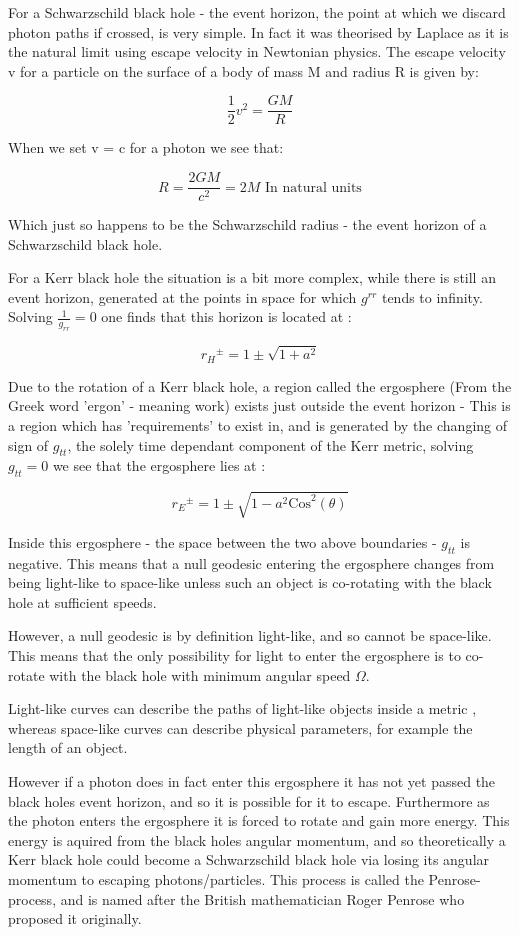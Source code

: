 \documentclass[oneside,openright,frontopenright]{dmathesis}
\begin{document}
	For a Schwarzschild black hole - the event horizon, the point at which we discard photon paths if crossed, is very simple. In fact it was theorised by Laplace as it is the natural limit using escape velocity in Newtonian physics. The escape velocity v for a particle on the surface of a body of mass M and radius R is given by:

	\[\frac{1}{2}v^2 = \frac{GM}{R}\]

	When we set v = c for a photon we see that:

	\[R = \frac{2GM}{c^2} = 2M \mbox{ In natural units}\]

	Which just so happens to be the Schwarzschild radius - the event horizon of a Schwarzschild black hole.

	For a Kerr black hole the situation is a bit more complex, while there is still an event horizon, generated at the points in space for which $g^{rr}$ tends to infinity. Solving $\frac{1}{g_{rr}} = 0$ one finds that this horizon is located at \cite{kerrMetric}:

	\[{r_{H}}^{\pm} = 1\pm\sqrt{1+a^2}\]

	Due to the rotation of a Kerr black hole, a region called the ergosphere (From the Greek word 'ergon' - meaning work) exists just outside the event horizon - This is a region which has 'requirements' to exist in, and is generated by the changing of sign of $g_{tt}$, the solely time dependant component of the Kerr metric, solving $g_{tt} = 0$ we see that the ergosphere lies at \cite{kerrMetric}:

	\[{r_{E}}^{\pm} = 1\pm\sqrt{1-a^2\mbox{Cos}^2(\theta)}\]

	Inside this ergosphere - the space between the two above boundaries - $g_{tt}$ is negative. This means that a null geodesic entering the ergosphere changes from being light-like to space-like unless such an object is co-rotating with the black hole at sufficient speeds.

	However, a null geodesic is by definition light-like, and so cannot be space-like. This means that the only possibility for light to enter the ergosphere is to co-rotate with the black hole with minimum angular speed $\Omega$.

	Light-like curves can describe the paths of light-like objects inside a metric , whereas space-like curves can describe physical parameters, for example the length of an object.

	However if a photon does in fact enter this ergosphere it has not yet passed the black holes event horizon, and so it is possible for it to escape. Furthermore as the photon enters the ergosphere it is forced to rotate and gain more energy. This energy is aquired from the black holes angular momentum, and so theoretically a Kerr black hole could become a Schwarzschild black hole via losing its angular momentum to escaping photons/particles. This process is called the Penrose-process, and is named after the British mathematician Roger Penrose who proposed it originally.
\end{document}
